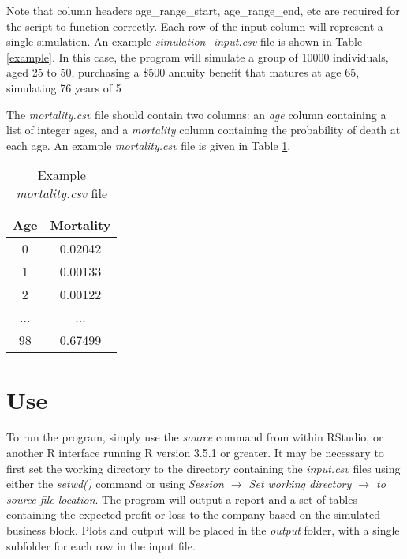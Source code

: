 \documentclass[12pt]{article}
\begin{document}
Note that column headers age\_range\_start, age\_range\_end, etc are required for the script to function correctly. Each row of the input column will represent a single simulation. An example \textit{simulation\_input.csv} file is shown in Table \ref{example}. In this case, the program will simulate a group of 10000 individuals, aged 25 to 50, purchasing a \$500 annuity benefit that matures at age 65, simulating 76 years of 5%



\begin{table}[H]
	\centering
		\label{example}
\caption{Example \textit{simulation\_input.csv} file}
	
\end{table}

The \textit{mortality.csv} file should contain two columns: an \textit{age} column containing a list of integer ages, and a \textit{mortality} column containing the probability of death at each age. An example \textit{mortality.csv} file is given in Table \ref{mortality}. 

\begin{table}[H]
	\centering
	\begin{tabular}{|c|c|}
		\hline
		Age & Mortality \\ \hline
		0 & 0.02042 \\ \hline
		1 & 0.00133 \\ \hline
		2 & 0.00122 \\ \hline
		... & ... \\ \hline
		98 & 0.67499 \\ \hline
	\end{tabular}
	\caption{Example \textit{mortality.csv} file}
	\label{mortality}
\end{table}


\section{Use}

To run the program, simply use the \textit{source} command from within RStudio, or another R interface running R version 3.5.1 or greater. It may be necessary to first set the working directory to the directory containing the \textit{input.csv} files using either the \textit{setwd()} command or using \textit{Session $\rightarrow$ Set working directory $\rightarrow$ to source file location}. The program will output a report and a set of tables containing the expected profit or loss to the company based on the simulated business block. Plots and output will be placed in the \textit{output} folder, with a single subfolder for each row in the input file. 
\end{document}
